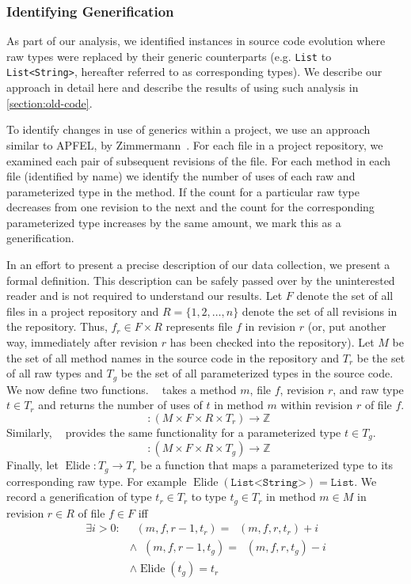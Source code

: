 \documentclass{svjour3}
\newcommand{\code}[1]{\texttt{#1}}
\DeclareMathOperator{\typesr}{Types_r}
\DeclareMathOperator{\typesg}{Types_g}
\DeclareMathOperator{\rawtype}{Elide}
\begin{document}
\subsubsection{Identifying Generification}
\label{section:find-migrations}

As part of our analysis, we identified instances in source code
evolution where raw types were replaced by their generic counterparts
(e.g. \code{List} to \code{List<String>}, hereafter referred to as corresponding types).
We describe our approach
in detail here and describe the results of using such analysis in \autoref{section:old-code}.

To identify changes in use of generics within a project, we use an
approach similar to APFEL, by Zimmermann~\cite{zimmermann2006apfel}.
For each file in a project repository, we examined each pair of subsequent
revisions of the file.  For each method in each file (identified by name)
we identify the number of uses of each raw and parameterized type in the method.
If the count for a particular raw type decreases from one revision to the next
and the count for the corresponding parameterized type increases by the same amount,
we mark this as a generification.  

In an effort to present a precise description of our data collection, we present
a formal definition.  This description can be safely passed over by the uninterested
reader and is not required to understand our results.
Let $F$ denote the set of all files in a project repository and
$R=\{1,2,\ldots,n\}$ denote the set of all revisions in the repository.  Thus,
$f_r \in F \times R$ represents file $f$ in revision $r$ (or, put another way,
immediately after revision $r$ has been checked into the repository).  Let $M$ be the
set of all method names in the source code in the repository and $T_r$ be the set of all raw types 
and $T_g$ be the set of all parameterized types in the source code.  We now define two functions.
$\typesr$ takes a method $m$, file $f$, revision $r$, and raw type $t \in T_r$ and returns the number of uses
of $t$ in method $m$ within revision $r$ of file $f$.
$$\typesr : (M \times F \times R \times T_r) \rightarrow \mathbb{Z}$$
Similarly, $\typesg$ provides the same functionality for a parameterized type $t \in T_g$.
$$\typesg : (M \times F \times R \times T_g) \rightarrow \mathbb{Z}$$
Finally, let $\rawtype : T_g \rightarrow T_r$ be a function that maps a parameterized type
to its corresponding raw type.  For example 
$\rawtype(\code{List<String>}) = \code{List}$.
We record a generification of type $t_r \in T_r$ to type
$t_g \in T_r$ in method $m \in M$ in revision $r \in R$ of file $f \in F$ iff
\begin{align*}
\exists i > 0 : & \typesr(m, f, r-1, t_r) = \typesr(m, f, r, t_r) + i \\
& \land \typesg(m, f, r-1, t_g) = \typesg(m, f, r, t_g) - i \\
& \land \rawtype(t_g) = t_r
\end{align*}
\end{document}
